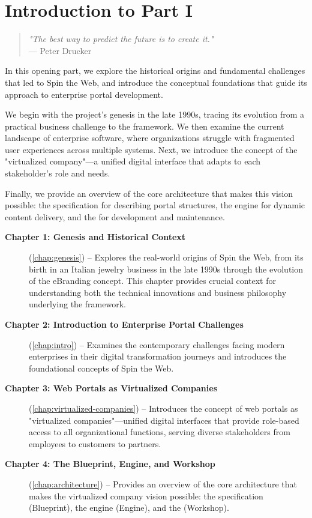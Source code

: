 
\chapter*{Introduction to Part I}
\label{part:foundations}

\begin{quote}
\textit{"The best way to predict the future is to create it."} \\
— Peter Drucker
\end{quote}

In this opening part, we explore the historical origins and fundamental challenges that led to Spin the Web, and introduce the conceptual foundations that guide its approach to enterprise portal development.

We begin with the project's genesis in the late 1990s, tracing its evolution from a practical business challenge to the framework. We then examine the current landscape of enterprise software, where organizations struggle with fragmented user experiences across multiple systems. Next, we introduce the concept of the "virtualized company"—a unified digital interface that adapts to each stakeholder's role and needs.

Finally, we provide an overview of the core architecture that makes this vision possible: the \wbdl{} specification for describing portal structures, the \webspinner{} engine for dynamic content delivery, and the \studio{} for development and maintenance.

\begin{description}
\item[\textbf{Chapter 1: Genesis and Historical Context}] (\cref{chap:genesis}) -- Explores the real-world origins of Spin the Web, from its birth in an Italian jewelry business in the late 1990s through the evolution of the eBranding concept. This chapter provides crucial context for understanding both the technical innovations and business philosophy underlying the framework.

\item[\textbf{Chapter 2: Introduction to Enterprise Portal Challenges}] (\cref{chap:intro}) -- Examines the contemporary challenges facing modern enterprises in their digital transformation journeys and introduces the foundational concepts of Spin the Web.

\item[\textbf{Chapter 3: Web Portals as Virtualized Companies}] (\cref{chap:virtualized-companies}) -- Introduces the concept of web portals as "virtualized companies"—unified digital interfaces that provide role-based access to all organizational functions, serving diverse stakeholders from employees to customers to partners.

\item[\textbf{Chapter 4: The Blueprint, Engine, and Workshop}] (\cref{chap:architecture}) -- Provides an overview of the core architecture that makes the virtualized company vision possible: the \wbdl{} specification (Blueprint), the \webspinner{} engine (Engine), and the \studio{} (Workshop).
\end{description}

